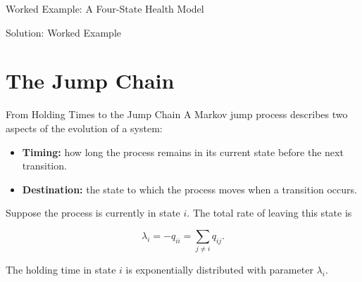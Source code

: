 \documentclass[
  ignorenonframetext,
  aspectratio=169,
]{beamer}
\providecommand{\tightlist}{%
  \setlength{\itemsep}{0pt}\setlength{\parskip}{0pt}}
\begin{document}
\begin{frame}{Worked Example: A Four-State Health Model}
\begin{center}
\end{center}
\end{frame}

\begin{frame}{Solution: Worked Example}
\protect{}\label{solution-worked-example}
\end{frame}

\section{The Jump Chain}\label{the-jump-chain}

\begin{frame}{From Holding Times to the Jump Chain}
\protect{}\label{from-holding-times-to-the-jump-chain}
A Markov jump process describes two aspects of the evolution of a
system:

\begin{itemize}
\tightlist
\item
  \textbf{Timing:} how long the process remains in its current state
  before the next transition.
\item
  \textbf{Destination:} the state to which the process moves when a
  transition occurs.
\end{itemize}

Suppose the process is currently in state \(i\). The total rate of
leaving this state is

\[
\lambda_i=-q_{ii}=\sum_{j\neq i}q_{ij}.
\]

The holding time in state \(i\) is exponentially distributed with
parameter \(\lambda_i\).
\end{frame}
\end{document}
